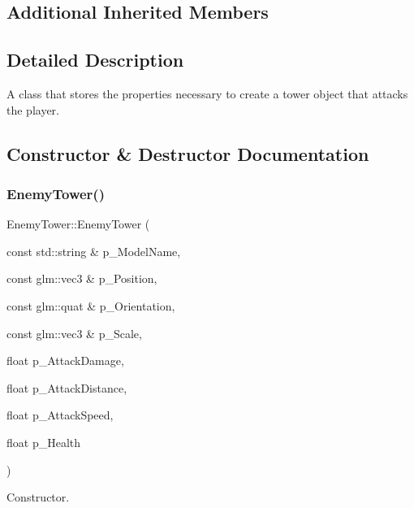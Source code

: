 \subsection*{Additional Inherited Members}


\subsection{Detailed Description}
A class that stores the properties necessary to create a tower object that attacks the player. 

\subsection{Constructor \& Destructor Documentation}
\mbox{\label{class_enemy_tower_ace06a9d69e04e93e30fe87a2b36ba282}} 
\subsubsection{\texorpdfstring{EnemyTower()}{EnemyTower()}\hspace{0.1cm}{\footnotesize\ttfamily [1/2]}}
{\footnotesize\ttfamily Enemy\+Tower\+::\+Enemy\+Tower (\begin{DoxyParamCaption}\item[{const std\+::string \&}]{p\+\_\+\+Model\+Name,  }\item[{const glm\+::vec3 \&}]{p\+\_\+\+Position,  }\item[{const glm\+::quat \&}]{p\+\_\+\+Orientation,  }\item[{const glm\+::vec3 \&}]{p\+\_\+\+Scale,  }\item[{float}]{p\+\_\+\+Attack\+Damage,  }\item[{float}]{p\+\_\+\+Attack\+Distance,  }\item[{float}]{p\+\_\+\+Attack\+Speed,  }\item[{float}]{p\+\_\+\+Health }\end{DoxyParamCaption})}



Constructor. 


